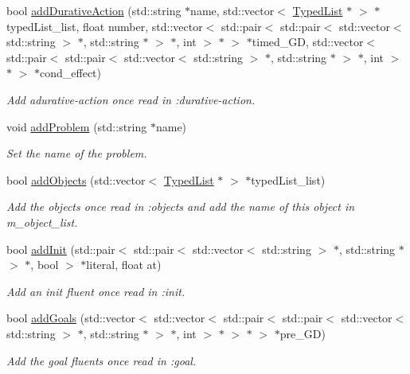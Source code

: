 \begin{DoxyCompactItemize}
bool \hyperlink{classParser_ac9d6477dcb6f8d7b6995f9b1b35c5805}{add\+Durative\+Action} (std\+::string $\ast$name, std\+::vector$<$ \hyperlink{classTypedList}{Typed\+List} $\ast$ $>$ $\ast$typed\+List\+\_\+list, float number, std\+::vector$<$ std\+::pair$<$ std\+::pair$<$ std\+::vector$<$ std\+::string $>$ $\ast$, std\+::string $\ast$ $>$ $\ast$, int $>$ $\ast$ $>$ $\ast$timed\+\_\+\+G\+D, std\+::vector$<$ std\+::pair$<$ std\+::pair$<$ std\+::vector$<$ std\+::string $>$ $\ast$, std\+::string $\ast$ $>$ $\ast$, int $>$ $\ast$ $>$ $\ast$cond\+\_\+effect)
\begin{DoxyCompactList}\small\item\em Add adurative-\/action once read in \+:durative-\/action. \end{DoxyCompactList}\item 
void \hyperlink{classParser_a40779a6e2c720a1415a0c824bf079b47}{add\+Problem} (std\+::string $\ast$name)
\begin{DoxyCompactList}\small\item\em Set the name of the problem. \end{DoxyCompactList}\item 
bool \hyperlink{classParser_a5784fcd1e2de901d7a0f12412754b724}{add\+Objects} (std\+::vector$<$ \hyperlink{classTypedList}{Typed\+List} $\ast$ $>$ $\ast$typed\+List\+\_\+list)
\begin{DoxyCompactList}\small\item\em Add the objects once read in \+:objects and add the name of this object in m\+\_\+object\+\_\+list. \end{DoxyCompactList}\item 
bool \hyperlink{classParser_aaae009ea97709247577c76937427ffef}{add\+Init} (std\+::pair$<$ std\+::pair$<$ std\+::vector$<$ std\+::string $>$ $\ast$, std\+::string $\ast$ $>$ $\ast$, bool $>$ $\ast$literal, float at)
\begin{DoxyCompactList}\small\item\em Add an init fluent once read in \+:init. \end{DoxyCompactList}\item 
bool \hyperlink{classParser_ac7b9f22b8589d44b28ad5170f1b9b403}{add\+Goals} (std\+::vector$<$ std\+::vector$<$ std\+::pair$<$ std\+::pair$<$ std\+::vector$<$ std\+::string $>$ $\ast$, std\+::string $\ast$ $>$ $\ast$, int $>$ $\ast$ $>$ $\ast$ $>$ $\ast$pre\+\_\+\+G\+D)
\begin{DoxyCompactList}\small\item\em Add the goal fluents once read in \+:goal. \end{DoxyCompactList}\item 

\end{DoxyCompactItemize}
